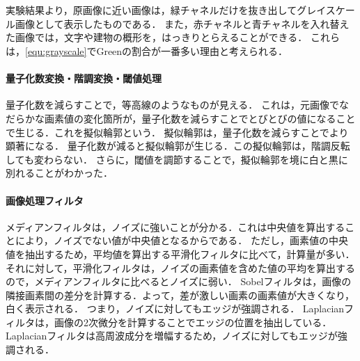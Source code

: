 \section{\consideration}
\paragraph{\kadaiaa}
実験結果より，原画像に近い画像は，緑チャネルだけを抜き出してグレイスケール画像として表示したものである．
また，赤チャネルと青チャネルを入れ替えた画像では，文字や建物の概形を，はっきりとらえることができる．
これらは，\eqref{equ:grayscale}でGreenの割合が一番多い理由と考えられる．
\paragraph{量子化数変換・階調変換・閾値処理}
量子化数を減らすことで，等高線のようなものが見える．
これは，元画像でなだらかな画素値の変化箇所が，量子化数を減らすことでとびとびの値になることで生じる．これを擬似輪郭という．
擬似輪郭は，量子化数を減らすことでより顕著になる．
量子化数が減ると擬似輪郭が生じる．この擬似輪郭は，階調反転しても変わらない．
さらに，閾値を調節することで，擬似輪郭を境に白と黒に別れることがわかった．
\paragraph{画像処理フィルタ}
メディアンフィルタは，ノイズに強いことが分かる．これは中央値を算出することにより，ノイズでない値が中央値となるからである．
ただし，画素値の中央値を抽出するため，平均値を算出する平滑化フィルタに比べて，計算量が多い．
それに対して，平滑化フィルタは，ノイズの画素値を含めた値の平均を算出するので，メディアンフィルタに比べるとノイズに弱い．
Sobelフィルタは，画像の隣接画素間の差分を計算する．よって，差が激しい画素の画素値が大きくなり，白く表示される．
つまり，ノイズに対してもエッジが強調される．
Laplacianフィルタは，画像の2次微分を計算することでエッジの位置を抽出している．Laplacianフィルタは高周波成分を増幅するため，ノイズに対してもエッジが強調される．
